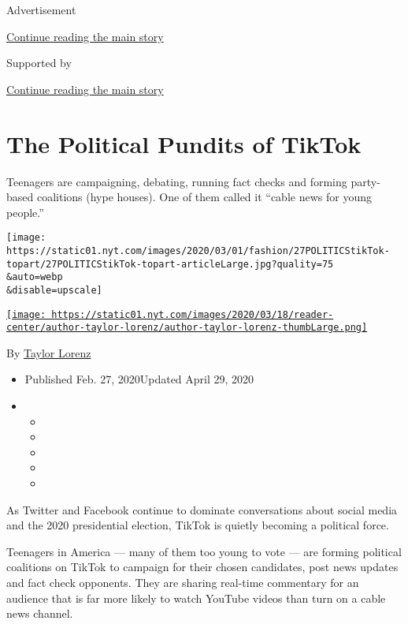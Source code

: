 Advertisement

\protect\hyperlink{after-top}{Continue reading the main story}

Supported by

\protect\hyperlink{after-sponsor}{Continue reading the main story}

\hypertarget{the-political-pundits-of-tiktok}{%
\section{The Political Pundits of
TikTok}\label{the-political-pundits-of-tiktok}}

Teenagers are campaigning, debating, running fact checks and forming
party-based coalitions (hype houses). One of them called it ``cable news
for young people.''

\texttt{[image: https://static01.nyt.com/images/2020/03/01/fashion/27POLITICStikTok-topart/27POLITICStikTok-topart-articleLarge.jpg?quality=75\\\&auto=webp\\\&disable=upscale]}

\href{https://www.nytimes.com/by/taylor-lorenz}{\texttt{[image: https://static01.nyt.com/images/2020/03/18/reader-center/author-taylor-lorenz/author-taylor-lorenz-thumbLarge.png]}}

By \href{https://www.nytimes.com/by/taylor-lorenz}{Taylor Lorenz}

\begin{itemize}
\item
  Published Feb. 27, 2020Updated April 29, 2020
\item
  \begin{itemize}
  \item
  \item
  \item
  \item
  \item
  \end{itemize}
\end{itemize}

As Twitter and Facebook continue to dominate conversations about social
media and the 2020 presidential election, TikTok is quietly becoming a
political force.

Teenagers in America --- many of them too young to vote --- are forming
political coalitions on TikTok to campaign for their chosen candidates,
post news updates and fact check opponents. They are sharing real-time
commentary for an audience that is far more likely to watch YouTube
videos than turn on a cable news channel.

